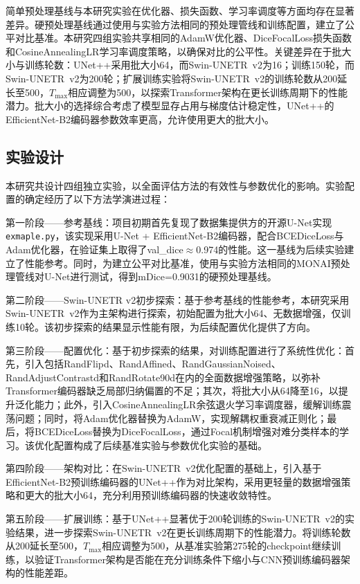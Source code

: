 \documentclass[12pt, a4paper]{article}
\begin{document}
简单预处理基线与本研究实验在优化器、损失函数、学习率调度等方面均存在显著差异。硬预处理基线通过使用与实验方法相同的预处理管线和训练配置，建立了公平对比基准。本研究四组实验共享相同的AdamW优化器、DiceFocalLoss损失函数和CosineAnnealingLR学习率调度策略，以确保对比的公平性。关键差异在于批大小与训练轮数：UNet++采用批大小64，而Swin-UNETR~v2为16；训练150轮，而Swin-UNETR~v2为200轮；扩展训练实验将Swin-UNETR~v2的训练轮数从200延长至500，$T_{\max}$相应调整为500，以探索Transformer架构在更长训练周期下的性能潜力。批大小的选择综合考虑了模型显存占用与梯度估计稳定性，UNet++的EfficientNet-B2编码器参数效率更高，允许使用更大的批大小。

\subsection{实验设计}
\label{sec:exp_design}

本研究共设计四组独立实验，以全面评估方法的有效性与参数优化的影响。实验配置的确定经历了以下方法学演进过程：

第一阶段——参考基线：项目初期首先复现了数据集提供方的开源U-Net实现\texttt{exmaple.py}，该实现采用U-Net + EfficientNet-B2编码器，配合BCEDiceLoss与Adam优化器，在验证集上取得了val\_dice$\approx$0.974的性能。这一基线为后续实验建立了性能参考。同时，为建立公平对比基准，使用与实验方法相同的MONAI预处理管线对U-Net进行测试，得到mDice=0.9031的硬预处理基线。

第二阶段——Swin-UNETR v2初步探索：基于参考基线的性能参考，本研究采用Swin-UNETR~v2作为主架构进行探索，初始配置为批大小64、无数据增强，仅训练10轮。该初步探索的结果显示性能有限，为后续配置优化提供了方向。

第三阶段——配置优化：基于初步探索的结果，对训练配置进行了系统性优化：首先，引入包括RandFlipd、RandAffined、RandGaussianNoised、RandAdjustContrastd和RandRotate90d在内的全面数据增强策略，以弥补Transformer编码器缺乏局部归纳偏置的不足；其次，将批大小从64降至16，以提升泛化能力；此外，引入CosineAnnealingLR余弦退火学习率调度器，缓解训练震荡问题；同时，将Adam优化器替换为AdamW，实现解耦权重衰减正则化；最后，将BCEDiceLoss替换为DiceFocalLoss，通过Focal机制增强对难分类样本的学习。该优化配置构成了后续基准实验与参数优化实验的基础。

第四阶段——架构对比：在Swin-UNETR~v2优化配置的基础上，引入基于EfficientNet-B2预训练编码器的UNet++作为对比架构，采用更轻量的数据增强策略和更大的批大小64，充分利用预训练编码器的快速收敛特性。

第五阶段——扩展训练：基于UNet++显著优于200轮训练的Swin-UNETR~v2的实验结果，进一步探索Swin-UNETR~v2在更长训练周期下的性能潜力。将训练轮数从200延长至500，$T_{\max}$相应调整为500，从基准实验第275轮的checkpoint继续训练，以验证Transformer架构是否能在充分训练条件下缩小与CNN预训练编码器架构的性能差距。
\end{document}
